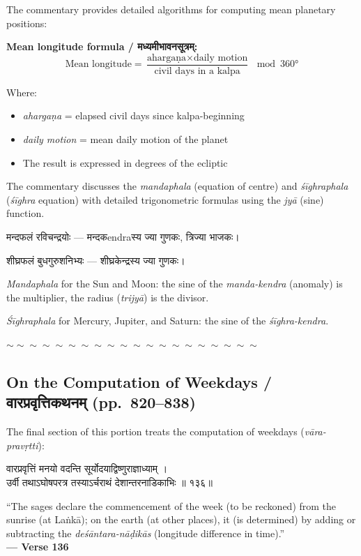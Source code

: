 \documentclass[11pt,a4paper]{article}
\newcommand{\dev}[1]{{\devanagarifont #1}}
\newenvironment{bilingualverse}{%
  \begin{paracol}{2}
  \fontsize{10.5}{13}\selectfont
}{%
  \end{paracol}
  \vspace{0.3cm}
}
\newcommand{\wavydivider}{\begin{center}$\sim\sim\sim\sim\sim\sim\sim\sim\sim\sim\sim\sim\sim\sim\sim\sim\sim\sim\sim\sim$\end{center}}
\newenvironment{paracol}[1]{\begingroup}{\endgroup}
\newenvironment{leftcolumn*}{\begingroup}{\endgroup}
\newenvironment{rightcolumn}{\begingroup}{\endgroup}
\begin{document}
The commentary provides detailed algorithms for computing mean planetary positions:

\textbf{Mean longitude formula / \dev{मध्यमीभावनसूत्रम्}:}
\begin{equation*}
\text{Mean longitude} = \frac{\text{ahargaṇa} \times \text{daily motion}}{\text{civil days in a kalpa}} \mod 360°
\end{equation*}

Where:
\begin{itemize}[leftmargin=2em]
  \item \textit{ahargaṇa} = elapsed civil days since kalpa-beginning
  \item \textit{daily motion} = mean daily motion of the planet
  \item The result is expressed in degrees of the ecliptic
\end{itemize}

The commentary discusses the \textit{mandaphala} (equation of centre) and \textit{śīghraphala} (\textit{śīghra} equation) with detailed trigonometric formulas using the \textit{jyā} (sine) function.

\begin{paracol}{2}
\begin{leftcolumn*}
\dev{मन्दफलं रविचन्द्रयोः — मन्दकendraस्य ज्या गुणकः, त्रिज्या भाजकः।}

\dev{शीघ्रफलं बुधगुरुशनिभ्यः — शीघ्रकेन्द्रस्य ज्या गुणकः।}
\end{leftcolumn*}
\begin{rightcolumn}
\textit{Mandaphala} for the Sun and Moon: the sine of the \textit{manda-kendra} (anomaly) is the multiplier, the radius (\textit{trijyā}) is the divisor.

\textit{Śīghraphala} for Mercury, Jupiter, and Saturn: the sine of the \textit{śīghra-kendra}.
\end{rightcolumn}
\end{paracol}

\wavydivider

\subsection*{On the Computation of Weekdays / \dev{वारप्रवृत्तिकथनम्} (pp.\ 820--838)}

The final section of this portion treats the computation of weekdays (\textit{vāra-pravṛtti}):

\begin{bilingualverse}
\begin{leftcolumn*}
\dev{वारप्रवृत्तिं मनयो वदन्ति सूर्योदयाद्विष्णुराज्ञाध्याम् ।}\\
\dev{उर्वी तथाऽघोषपरत्र तस्याऽर्चराथं देशान्तरनाडिकाभिः ॥ १३६॥}
\end{leftcolumn*}
\begin{rightcolumn}
``The sages declare the commencement of the week (to be reckoned) from the sunrise (at Laṅkā); on the earth (at other places), it (is determined) by adding or subtracting the \textit{deśāntara-nāḍikās} (longitude difference in time).''\\[0.3cm]
\hfill\textbf{— Verse 136}
\end{rightcolumn}
\end{bilingualverse}
\end{document}
